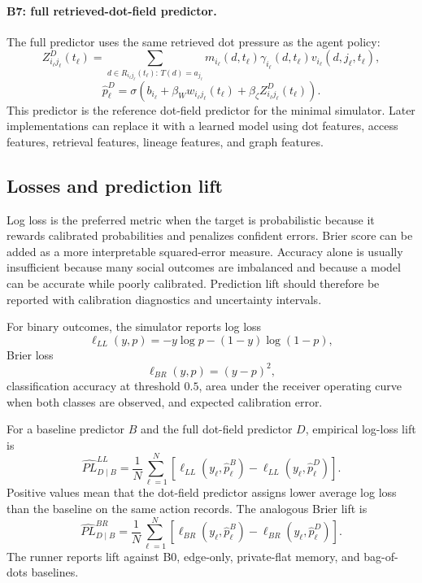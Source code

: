 \documentclass[11pt]{article}
\theoremstyle{remark}
\begin{document}
\paragraph{B7: full retrieved-dot-field predictor.}
The full predictor uses the same retrieved dot pressure as the agent policy:
\[
Z_{i_\ell j_\ell}^{D}(t_\ell)
=
\sum_{d\in R_{i_\ell j_\ell}(t_\ell):\,T(d)=a_{j_\ell}}
 m_{i_\ell}(d,t_\ell)\gamma_{i_\ell}(d,t_\ell)v_{i_\ell}(d,j_\ell,t_\ell),
\]
\[
\widehat p_\ell^D
=\sigma\left(b_{i_\ell}+\beta_W w_{i_\ell j_\ell}(t_\ell)+
\beta_\zeta Z_{i_\ell j_\ell}^{D}(t_\ell)\right).
\]
This predictor is the reference dot-field predictor for the minimal simulator.
Later implementations can replace it with a learned model using dot features,
access features, retrieval features, lineage features, and graph features.

\subsection{Losses and prediction lift}\label{losses-and-prediction-lift}

Log loss is the preferred metric when the target is probabilistic because it rewards calibrated probabilities and penalizes confident errors. Brier score can be added as a more interpretable squared-error measure. Accuracy alone is usually insufficient because many social outcomes are imbalanced and because a model can be accurate while poorly calibrated. Prediction lift should therefore be reported with calibration diagnostics and uncertainty intervals.


For binary outcomes, the simulator reports log loss
\[
\ell_{LL}(y,p)=-y\log p-(1-y)\log(1-p),
\]
Brier loss
\[
\ell_{BR}(y,p)=(y-p)^2,
\]
classification accuracy at threshold $0.5$, area under the receiver operating
curve when both classes are observed, and expected calibration error.

For a baseline predictor $B$ and the full dot-field predictor $D$, empirical
log-loss lift is
\[
\widehat{PL}_{D\mid B}^{LL}
=
\frac{1}{N}\sum_{\ell=1}^{N}
\left[\ell_{LL}(y_\ell,\widehat p_\ell^B)-
\ell_{LL}(y_\ell,\widehat p_\ell^D)\right].
\]
Positive values mean that the dot-field predictor assigns lower average log loss
than the baseline on the same action records. The analogous Brier lift is
\[
\widehat{PL}_{D\mid B}^{BR}
=
\frac{1}{N}\sum_{\ell=1}^{N}
\left[\ell_{BR}(y_\ell,\widehat p_\ell^B)-
\ell_{BR}(y_\ell,\widehat p_\ell^D)\right].
\]
The runner reports lift against B0, edge-only, private-flat memory, and
bag-of-dots baselines.
\end{document}
